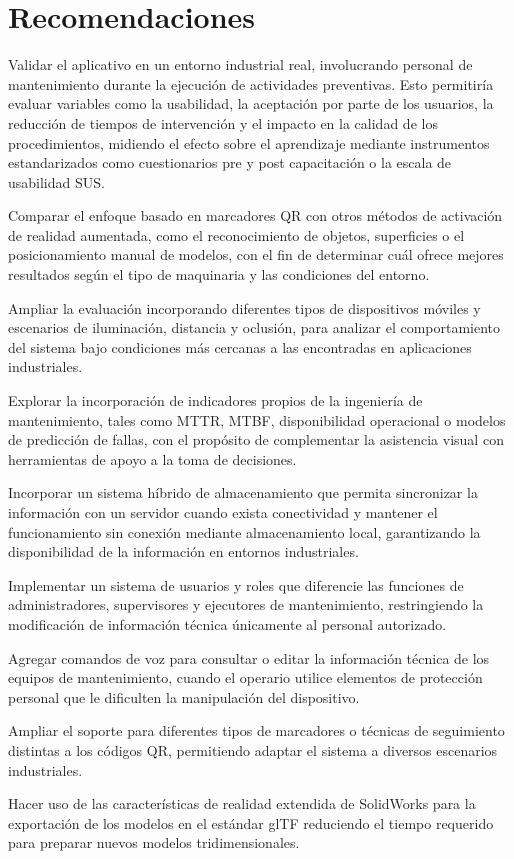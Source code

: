 \section{Recomendaciones}

    Validar el aplicativo en un entorno industrial real, involucrando personal de mantenimiento durante la ejecución de actividades preventivas. Esto permitiría evaluar variables como la usabilidad, la aceptación por parte de los usuarios, la reducción de tiempos de intervención y el impacto en la calidad de los procedimientos, midiendo el efecto sobre el aprendizaje mediante instrumentos estandarizados como cuestionarios pre y post capacitación o la escala de usabilidad SUS.

    Comparar el enfoque basado en marcadores QR con otros métodos de activación de realidad aumentada, como el reconocimiento de objetos, superficies o el posicionamiento manual de modelos, con el fin de determinar cuál ofrece mejores resultados según el tipo de maquinaria y las condiciones del entorno.

    Ampliar la evaluación incorporando diferentes tipos de dispositivos móviles y escenarios de iluminación, distancia y oclusión, para analizar el comportamiento del sistema bajo condiciones más cercanas a las encontradas en aplicaciones industriales.

    Explorar la incorporación de indicadores propios de la ingeniería de mantenimiento, tales como MTTR, MTBF, disponibilidad operacional o modelos de predicción de fallas, con el propósito de complementar la asistencia visual con herramientas de apoyo a la toma de decisiones.

    Incorporar un sistema híbrido de almacenamiento que permita sincronizar la información con un servidor cuando exista conectividad y mantener el funcionamiento sin conexión mediante almacenamiento local, garantizando la disponibilidad de la información en entornos industriales.
    
    Implementar un sistema de usuarios y roles que diferencie las funciones de administradores, supervisores y ejecutores de mantenimiento, restringiendo la modificación de información técnica únicamente al personal autorizado.

    Agregar comandos de voz para consultar o editar la información técnica de los equipos de mantenimiento, cuando el operario utilice elementos de protección personal que le dificulten la manipulación del dispositivo.

    Ampliar el soporte para diferentes tipos de marcadores o técnicas de seguimiento distintas a los códigos QR, permitiendo adaptar el sistema a diversos escenarios industriales.

    Hacer uso de las características de realidad extendida de SolidWorks para la exportación de los modelos en el estándar glTF reduciendo el tiempo requerido para preparar nuevos modelos tridimensionales.